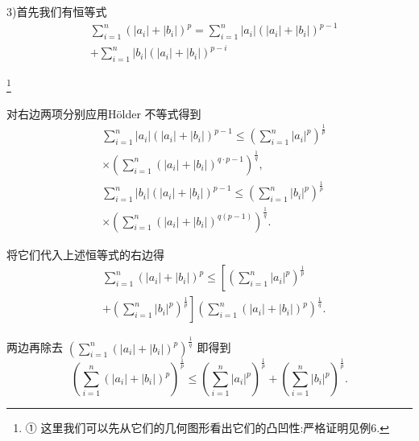 3)首先我们有恒等式
\begin{align*}
	&\mathop{\sum }\limits_{{i = 1}}^{n}{\left( \left| {a}_{i}\right|  + \left| {b}_{i}\right| \right) }^{p} = \mathop{\sum }\limits_{{i = 1}}^{n}\left| {a}_{i}\right| {\left( \left| {a}_{i}\right|  + \left| {b}_{i}\right| \right) }^{p - 1}\\
	&+ \mathop{\sum }\limits_{{i = 1}}^{n}\left| {b}_{i}\right| {\left( \left| {a}_{i}\right|  + \left| {b}_{i}\right| \right) }^{p - i}
\end{align*}

\footnote{
	
	① 这里我们可以先从它们的几何图形看出它们的凸凹性:严格证明见例6.
	
}

对右边两项分别应用Hölder 不等式得到
\begin{align*}
	&\mathop{\sum }\limits_{{i = 1}}^{n}\left| {a}_{i}\right| {\left( \left| {a}_{i}\right|  + \left| {b}_{i}\right| \right) }^{p - 1} \leq  {\left( \mathop{\sum }\limits_{{i = 1}}^{n}{\left| {a}_{i}\right| }^{p}\right) }^{\frac{1}{p}}\\
	&\times  {\left( \mathop{\sum }\limits_{{i = 1}}^{n}{\left( \left| {a}_{i}\right|  + \left| {b}_{i}\right| \right) }^{q \cdot  p - 1}\right) }^{\frac{1}{q}},\\
	&\mathop{\sum }\limits_{{i = 1}}^{n}\left| {b}_{i}\right| {\left( \left| {a}_{i}\right|  + \left| {b}_{i}\right| \right) }^{p - 1} \leq  {\left( \mathop{\sum }\limits_{{i = 1}}^{n}{\left| {b}_{i}\right| }^{p}\right) }^{\frac{1}{p}}\\
	&\times  {\left( \mathop{\sum }\limits_{{i = 1}}^{n}{\left( \left| {a}_{i}\right|  + \left| {b}_{i}\right| \right) }^{q\left( {p - 1}\right) }\right) }^{\frac{1}{q}}.
\end{align*}

将它们代入上述恒等式的右边得
\begin{align*}
	&\mathop{\sum }\limits_{{i = 1}}^{n}{\left( \left| {a}_{i}\right|  + \left| {b}_{i}\right| \right) }^{p} \leq  \left\lbrack  {\left( \mathop{\sum }\limits_{{i = 1}}^{n}{\left| {a}_{i}\right| }^{p}\right) }^{\frac{1}{p}}\right.\\
	&\left. {+{\left( \mathop{\sum }\limits_{{i = 1}}^{n}{\left| {b}_{i}\right| }^{p}\right) }^{\frac{1}{p}}}\right\rbrack  {\left( \mathop{\sum }\limits_{{i = 1}}^{n}{\left( \left| {a}_{i}\right|  + \left| {b}_{i}\right| \right) }^{p}\right) }^{\frac{1}{q}}.
\end{align*}

两边再除去 ${\left( \mathop{\sum }\limits_{{i = 1}}^{n}{\left( \left| {a}_{i}\right|  + \left| {b}_{i}\right| \right) }^{p}\right) }^{\frac{1}{q}}$ 即得到
$${\left( \mathop{\sum }\limits_{{i = 1}}^{n}{\left( \left| {a}_{i}\right|  + \left| {b}_{i}\right| \right) }^{p}\right) }^{\frac{1}{p}} \leq  {\left( \mathop{\sum }\limits_{{i = 1}}^{n}{\left| {a}_{i}\right| }^{p}\right) }^{\frac{1}{p}} + {\left( \mathop{\sum }\limits_{{i = 1}}^{n}{\left| {b}_{i}\right| }^{p}\right) }^{\frac{1}{p}}.$$

